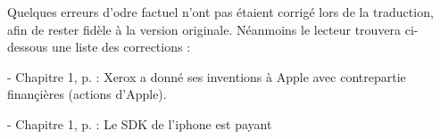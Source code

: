 Quelques erreurs d'odre factuel n'ont pas étaient corrigé lors de la traduction, afin de rester fidèle à la version originale. Néanmoins le lecteur trouvera ci-dessous une liste des corrections :

- Chapitre 1, p. : Xerox a donné ses inventions à Apple avec contrepartie finançières (actions d'Apple).

- Chapitre 1, p. : Le SDK de l'iphone est payant


